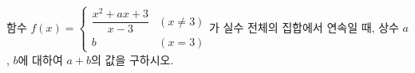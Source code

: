 함수 $f(x)=\begin{cases} \dfrac{x^2+ax+3}{x-3} & (x\ne 3) \\[1ex] b & (x=3) \end{cases}$가 실수 전체의 집합에서 연속일 때, 상수 $a$, $b$에 대하여 $a+b$의 값을 구하시오.

